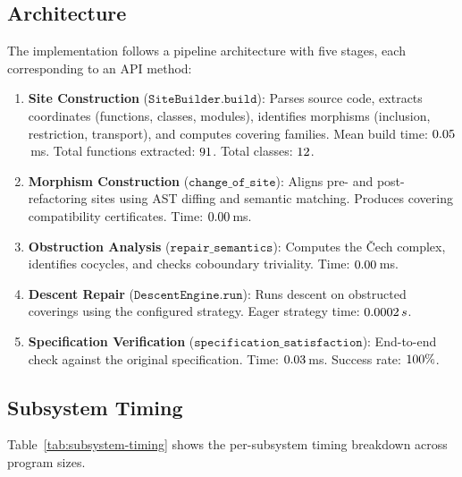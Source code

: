 \documentclass[11pt]{article}
\begin{document}
\subsection{Architecture}\label{ssec:architecture}

The implementation follows a pipeline architecture with five stages,
each corresponding to an API method:

\begin{enumerate}[noitemsep]
  \item \textbf{Site Construction} ($\texttt{SiteBuilder.build}$):
        Parses source code, extracts coordinates (functions, classes,
        modules), identifies morphisms (inclusion, restriction,
        transport), and computes covering families.  Mean build time:
        $0.05$\,ms.  Total functions extracted:
        $91$.  Total classes: $12$.
  \item \textbf{Morphism Construction} ($\texttt{change\_of\_site}$):
        Aligns pre- and post-refactoring sites using AST diffing and
        semantic matching.  Produces covering compatibility certificates.
        Time: $0.00$\,ms.
  \item \textbf{Obstruction Analysis} ($\texttt{repair\_semantics}$):
        Computes the Čech complex, identifies cocycles, and checks
        coboundary triviality.  Time:
        $0.00$\,ms.
  \item \textbf{Descent Repair} ($\texttt{DescentEngine.run}$):
        Runs descent on obstructed coverings using the configured
        strategy.  Eager strategy time: $0.0002\,s$.
  \item \textbf{Specification Verification}
        ($\texttt{specification\_satisfaction}$):
        End-to-end check against the original specification.
        Time: $0.03$\,ms.
        Success rate: $100\%$.
\end{enumerate}

\subsection{Subsystem Timing}\label{ssec:subsystem-timing}

Table~\ref{tab:subsystem-timing} shows the per-subsystem timing
breakdown across program sizes.
\end{document}
